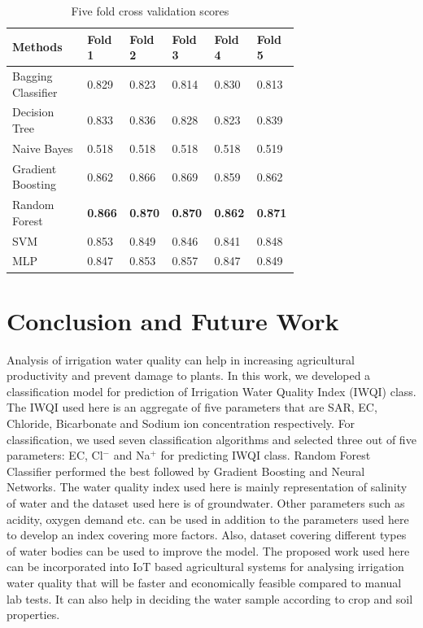 \documentclass[conference]{IEEEtran}
\begin{document}
\begin{table}
    \centering
    \caption{Five fold cross validation scores}
    \begin{tabular}{|m{0.25\linewidth}|m{0.09\linewidth}|m{0.09\linewidth}|m{0.09\linewidth}|m{0.09\linewidth}|m{0.09\linewidth}|}
    \hline
        \textbf{Methods} & \textbf{Fold 1} & \textbf{Fold 2} & \textbf{Fold 3} & \textbf{Fold 4} & \textbf{Fold 5} \\ \hline
        Bagging Classifier & 0.829 & 0.823 & 0.814 & 0.830 & 0.813 \\ \hline
        Decision Tree & 0.833 & 0.836 & 0.828 & 0.823 & 0.839 \\ \hline
        Naive Bayes & 0.518 & 0.518 & 0.518 & 0.518 & 0.519 \\ \hline
        Gradient Boosting & 0.862 & 0.866 & 0.869 & 0.859 & 0.862 \\ \hline
        Random Forest & \textbf{0.866} & \textbf{0.870} & \textbf{0.870} & \textbf{0.862} & \textbf{0.871} \\ \hline
        SVM & 0.853 & 0.849 & 0.846 & 0.841 & 0.848 \\ \hline
        MLP & 0.847 & 0.853 & 0.857 & 0.847 & 0.849 \\ \hline
    \end{tabular}
    \label{table:fiveFoldCrossValidation}
\end{table}



\section{Conclusion and Future Work}
\label{section:conclusionAndFutureWork}
Analysis of irrigation water quality can help in increasing agricultural productivity and prevent damage to plants. In this work, we developed a classification model for prediction of Irrigation Water Quality Index (IWQI) class. The IWQI used here is an aggregate of five parameters that are SAR, EC, Chloride, Bicarbonate and Sodium ion concentration respectively. For classification, we used seven classification algorithms and selected three out of five parameters: EC, Cl$^-$ and Na$^+$ for predicting IWQI class. Random Forest Classifier performed the best followed by Gradient Boosting and Neural Networks. The water quality index used here is mainly representation of salinity of water and the dataset used here is of groundwater. Other parameters such as acidity, oxygen demand etc. can be used in addition to the parameters used here to develop an index covering more factors. Also, dataset covering different types of water bodies can be used to improve the model. The proposed work used here can be incorporated into IoT based agricultural systems for analysing irrigation water quality that will be faster and economically feasible compared to manual lab tests. It can also help in deciding the water sample according to crop and soil properties.



      
 
\end{document}
